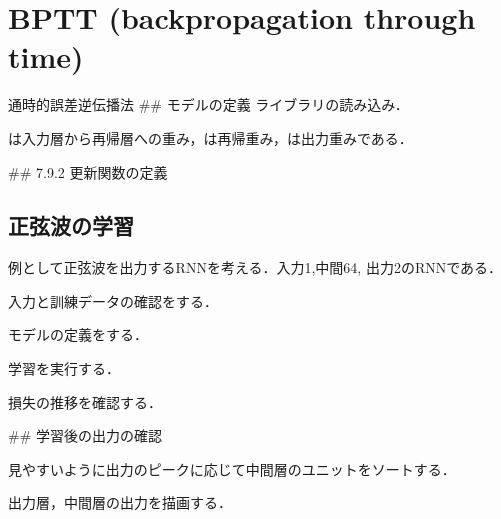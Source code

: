 \section{BPTT (backpropagation through time)}
通時的誤差逆伝播法
## モデルの定義
ライブラリの読み込み．



は入力層から再帰層への重み，は再帰重み，は出力重みである．

## 7.9.2 更新関数の定義

\subsection{正弦波の学習}
例として正弦波を出力するRNNを考える．入力1,中間64, 出力2のRNNである．

入力と訓練データの確認をする．


モデルの定義をする．

学習を実行する．

損失の推移を確認する．


## 学習後の出力の確認

見やすいように出力のピークに応じて中間層のユニットをソートする．

出力層，中間層の出力を描画する．



